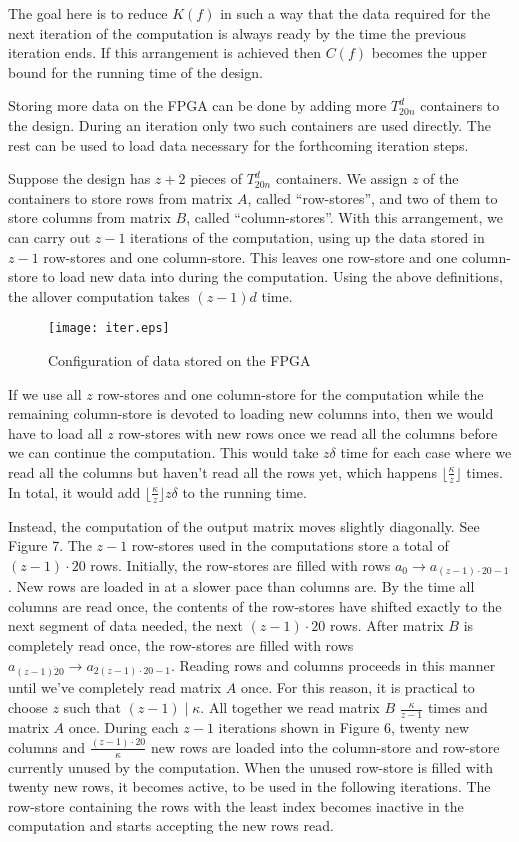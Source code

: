 \documentclass[11pt,twoside]{article}
\begin{document}
The goal here is to reduce $K(f)$ in such a way that the data required for the next iteration of the computation is always ready by the time the previous iteration ends. If this arrangement is achieved then $C(f)$ becomes the upper bound for the running time of the design.

Storing more data on the FPGA can be done by adding more $T_{20n}^{d}$ containers to the design. During an iteration only two such containers are used directly. The rest can be used to load data necessary for the forthcoming iteration steps.

Suppose the design has $z+2$ pieces of $T_{20n}^{d}$ containers. We assign $z$ of the containers to store rows from matrix $A$, called ``row-stores'', and two of them to store columns from matrix $B$, called ``column-stores''. With this arrangement, we can carry out $z-1$ iterations of the computation, using up the data stored in $z-1$ row-stores and one column-store. This leaves one row-store and one column-store to load new data into during the computation. Using the above definitions, the allover computation takes $(z-1)d$ time.

\begin{figure}[h!]
\centering
\texttt{[image: iter.eps]}
\caption{Configuration of data stored on the FPGA}
\end{figure}

If we use all $z$ row-stores and one column-store for the computation while the remaining column-store is devoted to loading new columns into, then we would have to load all $z$ row-stores with new rows once we read all the columns before we can continue the computation. This would take $z\delta$ time for each case where we read all the columns but haven't read all the rows yet, which happens $\lfloor \frac{\kappa}{z} \rfloor$ times. In total, it would add $\lfloor \frac{\kappa}{z} \rfloor z\delta$ to the running time.

Instead, the computation of the output matrix moves slightly diagonally. See Figure 7. The $z-1$ row-stores used in the computations store a total of $(z-1) \cdot 20$ rows. Initially, the row-stores are filled with rows $a_0 \rightarrow a_{(z-1)\cdot 20 -1}$. New rows are loaded in at a slower pace than columns are. By the time all columns are read once, the contents of the row-stores have shifted exactly to the next segment of data needed, the next $(z-1)\cdot 20$ rows. After matrix $B$ is completely read once, the row-stores are filled with rows $a_{(z-1)\dot 20} \rightarrow a_{2(z-1)\cdot 20 -1}$. Reading rows and columns proceeds in this manner until we've completely read matrix $A$ once. For this reason, it is practical to choose $z$ such that $(z-1)\mid \kappa$. All together we read matrix $B$ $\frac{\kappa}{z-1}$ times and matrix $A$ once. During each $z-1$ iterations shown in Figure 6, twenty new columns and $\frac{(z-1)\cdot 20}{\kappa}$ new rows are loaded into the column-store and row-store currently unused by the computation. When the unused row-store is filled with twenty new rows, it becomes active, to be used in the following iterations. The row-store containing the rows with the least index becomes inactive in the computation and starts accepting the new rows read.
\end{document}
